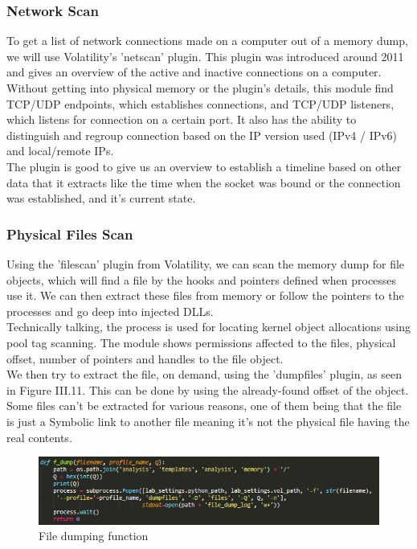 \subsubsection{Network Scan}
To get a list of network connections made on a computer out of a memory dump, we will use Volatility's 'netscan' plugin. This plugin was introduced around 2011 and gives an overview of the active and inactive connections on a computer.\\
Without getting into physical memory or the plugin's details, this module find TCP/UDP endpoints, which establishes connections, and TCP/UDP listeners, which listens for connection on a certain port. It also has the ability to distinguish and regroup connection based on the IP version used (IPv4 / IPv6) and local/remote IPs.\\
The plugin is good to give us an overview to establish a timeline based on other data that it extracts like the time when the socket was bound or the connection was established, and it's current state.

\subsubsection{Physical Files Scan}
Using the 'filescan' plugin from Volatility, we can scan the memory dump for file objects, which will find a file by the hooks and pointers defined when processes use it. We can then extract these files from memory or follow the pointers to the processes and go deep into injected DLLs.\\
Technically talking, the process is used for locating kernel object allocations using pool tag scanning. The module shows permissions affected to the files, physical offset, number of pointers and handles to the file object.\\
We then try to extract the file, on demand, using the 'dumpfiles' plugin, as seen in Figure III.11. This can be done by using the already-found offset of the object. Some files can't be extracted for various reasons, one of them being that the file is just a Symbolic link to another file meaning it's not the physical file having the real contents.
\begin{figure}[H]
\centering
\includegraphics[width=0.8\columnwidth]{Figures/filedump.png}
\caption{File dumping function}
\end{figure}

